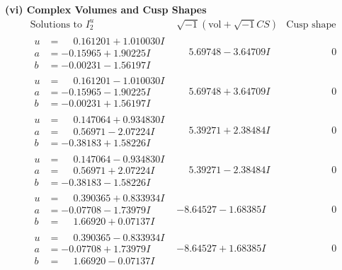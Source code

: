 \documentclass[1p]{elsarticle_modified}
\theoremstyle{definition}
\newcommand{\I}{\sqrt{-1}}
\begin{document}
\newpage\flushleft \textbf{(vi) Complex Volumes and Cusp Shapes}
$$\begin{array}{c|c|c}  
\text{Solutions to }I^u_{2}& \I (\text{vol} + \sqrt{-1}CS) & \text{Cusp shape}\\
 \hline 
\begin{aligned}
u &= \phantom{-}0.161201 + 1.010030 I \\
a &= -0.15965 + 1.90225 I \\
b &= -0.00231 - 1.56197 I\end{aligned}
 & \phantom{-}5.69748 - 3.64709 I & \phantom{-0.000000 } 0 \\ \hline\begin{aligned}
u &= \phantom{-}0.161201 - 1.010030 I \\
a &= -0.15965 - 1.90225 I \\
b &= -0.00231 + 1.56197 I\end{aligned}
 & \phantom{-}5.69748 + 3.64709 I & \phantom{-0.000000 } 0 \\ \hline\begin{aligned}
u &= \phantom{-}0.147064 + 0.934830 I \\
a &= \phantom{-}0.56971 - 2.07224 I \\
b &= -0.38183 + 1.58226 I\end{aligned}
 & \phantom{-}5.39271 + 2.38484 I & \phantom{-0.000000 } 0 \\ \hline\begin{aligned}
u &= \phantom{-}0.147064 - 0.934830 I \\
a &= \phantom{-}0.56971 + 2.07224 I \\
b &= -0.38183 - 1.58226 I\end{aligned}
 & \phantom{-}5.39271 - 2.38484 I & \phantom{-0.000000 } 0 \\ \hline\begin{aligned}
u &= \phantom{-}0.390365 + 0.833934 I \\
a &= -0.07708 - 1.73979 I \\
b &= \phantom{-}1.66920 + 0.07137 I\end{aligned}
 & -8.64527 - 1.68385 I & \phantom{-0.000000 } 0 \\ \hline\begin{aligned}
u &= \phantom{-}0.390365 - 0.833934 I \\
a &= -0.07708 + 1.73979 I \\
b &= \phantom{-}1.66920 - 0.07137 I\end{aligned}
 & -8.64527 + 1.68385 I & \phantom{-0.000000 } 0 \\ \hline\begin{aligned}

\end{aligned}
\end{array}$$
\end{document}
